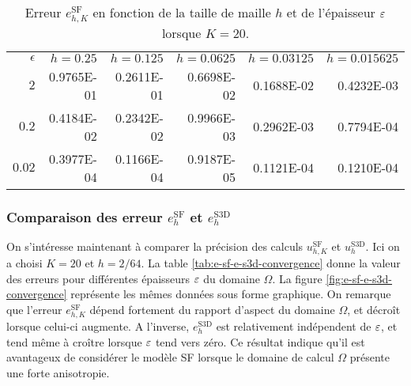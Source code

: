 \begin{table}
  \caption{Erreur $e_{h,K}^\mathrm{SF}$ en fonction de la taille de
    maille $h$ et de l'épaisseur $\varepsilon$ lorsque $K = 20$.}
  \label{tab:n-h-convergence}
  \begin{center}
    \begin{tabular}{@{}rrrrrr@{}}
      \toprule
      $\epsilon$ & $h = 0.25$ & $h = 0.125$ & $h = 0.0625$ & $h = 0.03125$ & $h = 0.015625$ \\
      \cmidrule{1-6}
      $2$      & \num{0.9765E-01} & \num{0.2611E-01} & \num{0.6698E-02} & \num{0.1688E-02} & \num{0.4232E-03} \\
      $0.2$    & \num{0.4184E-02} & \num{0.2342E-02} & \num{0.9966E-03} & \num{0.2962E-03} & \num{0.7794E-04} \\
      $0.02$   & \num{0.3977E-04} & \num{0.1166E-04} & \num{0.9187E-05} & \num{0.1121E-04} & \num{0.1210E-04} \\
      \bottomrule
    \end{tabular}
  \end{center}
\end{table}

\subsubsection{Comparaison des erreur $e_h^{\mathrm{SF}}$ et
  $e_h^{\mathrm{S3D}}$} On s'intéresse maintenant à comparer la
précision des calculs $u_{h,K}^\mathrm{SF}$ et
$u_h^{\mathrm{S3D}}$. Ici on a choisi $K = 20$ et $h = 2/64$. La table
\ref{tab:e-sf-e-s3d-convergence} donne la valeur des erreurs pour
différentes épaisseurs $\varepsilon$ du domaine $\Omega$. La figure
\ref{fig:e-sf-e-s3d-convergence} représente les mêmes données sous
forme graphique. On remarque que l'erreur $e_{h,K}^\mathrm{SF}$
dépend fortement du rapport d'aspect du domaine $\Omega$, et
décroît lorsque celui-ci augmente. A l'inverse, $e_h^\mathrm{S3D}$ est
relativement indépendent de $\varepsilon$, et tend même à croître
lorsque $\varepsilon$ tend vers zéro. Ce résultat indique qu'il est
avantageux de considérer le modèle SF lorsque le domaine de calcul
$\Omega$ présente une forte anisotropie.

